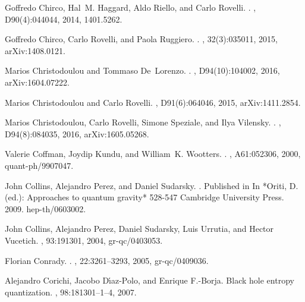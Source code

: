 \documentclass[aps, nofootinbib,superscriptaddress,12pt]{revtex4-2}
\begin{document}
\begin{thebibliography}{100}
Goffredo Chirco, Hal~M. Haggard, Aldo Riello, and Carlo Rovelli.
.
, D90(4):044044, 2014, 1401.5262.

Goffredo Chirco, Carlo Rovelli, and Paola Ruggiero.
.
, 32(3):035011, 2015, arXiv:1408.0121.

Marios Christodoulou and Tommaso De~Lorenzo.
.
, D94(10):104002, 2016, arXiv:1604.07222.

Marios Christodoulou and Carlo Rovelli.
, D91(6):064046, 2015, arXiv:1411.2854.

Marios Christodoulou, Carlo Rovelli, Simone Speziale, and Ilya Vilensky.
.
, D94(8):084035, 2016, arXiv:1605.05268.

Valerie Coffman, Joydip Kundu, and William~K. Wootters.
.
, A61:052306, 2000, quant-ph/9907047.

John Collins, Alejandro Perez, and Daniel Sudarsky.
.
  \newblock Published in In *Oriti, D. (ed.): Approaches to quantum gravity* 528-547 Cambridge University Press.  2009.
\newblock  hep-th/0603002.

John Collins, Alejandro Perez, Daniel Sudarsky, Luis Urrutia, and Hector
  Vucetich.
, 93:191301, 2004, gr-qc/0403053.

Florian Conrady.
.
, 22:3261--3293, 2005, gr-qc/0409036.

Alejandro Corichi, Jacobo D\'{\i}az-Polo, and Enrique F.-Borja.
\newblock Black hole entropy quantization.
, 98:181301--1--4, 2007.


\end{thebibliography}
\end{document}
